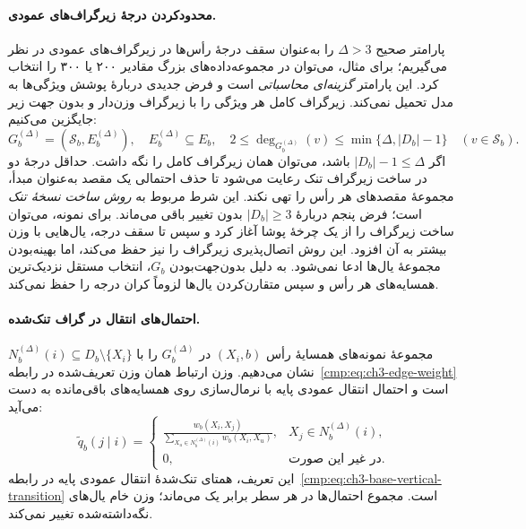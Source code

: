 \paragraph{محدودکردن درجهٔ زیرگراف‌های عمودی.}
پارامتر صحیح $\Delta>3$ را به‌عنوان
سقف درجهٔ رأس‌ها در زیرگراف‌های عمودی
در نظر می‌گیریم؛ برای مثال، می‌توان
در مجموعه‌داده‌های بزرگ مقادیر ۲۰۰ یا
۳۰۰ را انتخاب کرد. این پارامتر
\emph{گزینه‌ای محاسباتی} است و فرض جدیدی
دربارهٔ پوشش ویژگی‌ها به مدل تحمیل
نمی‌کند. زیرگراف کامل هر ویژگی را با
زیرگراف وزن‌دار و بدون جهت زیر
جایگزین می‌کنیم:
\begin{equation}\label{cmp:eq:ch3-sparse-feature-graph}
\boxed{
G_b^{(\Delta)}
=(\mathcal S_b,E_b^{(\Delta)}),
\quad E_b^{(\Delta)}\subseteq E_b,
\quad
2\le\deg_{G_b^{(\Delta)}}(v)
\le\min\{\Delta,|D_b|-1\}
\quad(v\in\mathcal S_b).
}
\end{equation}
اگر $|D_b|-1\le\Delta$ باشد، می‌توان
همان زیرگراف کامل را نگه داشت. حداقل
درجهٔ دو در ساخت زیرگراف تنک رعایت
می‌شود تا حذف احتمالی یک مقصد به‌عنوان
مبدأ، مجموعهٔ مقصدهای هر رأس را تهی
نکند. این شرط مربوط به \emph{روش ساخت
نسخهٔ تنک} است؛ فرض پنجم دربارهٔ
$|D_b|\ge3$ بدون تغییر باقی می‌ماند.
برای نمونه، می‌توان ساخت زیرگراف را
از یک چرخهٔ پوشا آغاز کرد و سپس
تا سقف درجه، یال‌هایی با وزن بیشتر
به آن افزود. این روش اتصال‌پذیری
زیرگراف را نیز حفظ می‌کند، اما
بهینه‌بودن مجموعهٔ یال‌ها ادعا نمی‌شود.
به دلیل بدون‌جهت‌بودن $G_b$، انتخاب
مستقل نزدیک‌ترین همسایه‌های هر رأس
و سپس متقارن‌کردن یال‌ها لزوماً
کران درجه را حفظ نمی‌کند.

\paragraph{احتمال‌های انتقال در گراف تنک‌شده.}
مجموعهٔ نمونه‌های همسایهٔ رأس $(X_i,b)$
در $G_b^{(\Delta)}$ را با
$N_b^{(\Delta)}(i)\subseteq D_b\setminus
\{X_i\}$ نشان می‌دهیم. وزن ارتباط
همان وزن تعریف‌شده در
رابطه~\eqref{cmp:eq:ch3-edge-weight}
است و احتمال انتقال عمودی پایه با
نرمال‌سازی روی همسایه‌های باقی‌مانده
به دست می‌آید:
\begin{equation}\label{cmp:eq:ch3-sparse-base-vertical-transition}
\boxed{
\widetilde q_b(j\mid i)=
\begin{cases}
\displaystyle
\frac{w_b(X_i,X_j)}
{\sum\limits_{X_u\in N_b^{(\Delta)}(i)}
w_b(X_i,X_u)},
&X_j\in N_b^{(\Delta)}(i),\\[6pt]
0,&\text{در غیر این صورت}.
\end{cases}
}
\end{equation}
این تعریف، همتای تنک‌شدهٔ انتقال
عمودی پایه در
رابطه~\eqref{cmp:eq:ch3-base-vertical-transition}
است. مجموع احتمال‌ها در هر سطر
برابر یک می‌ماند؛ وزن خام یال‌های
نگه‌داشته‌شده تغییر نمی‌کند.

